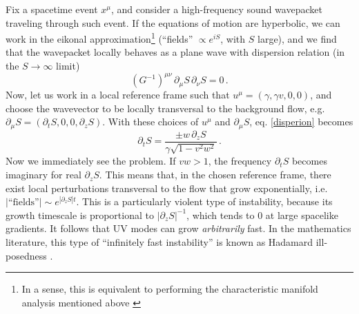 \documentclass[aps, prd, showkeys,superscriptaddress, nofootinbib,floatfix]{revtex4-2}
\begin{document}
Fix a spacetime event $x^\mu$, and consider a high-frequency sound wavepacket traveling through such event. If the equations of motion are hyperbolic, we can work in the eikonal approximation\footnote{In a sense, this is equivalent to performing the characteristic manifold analysis mentioned above \cite[\S 1.6]{Rauch_book}} (``fields'' $\propto e^{iS}$, with $S$ large), and we find that the wavepacket locally behaves as a plane wave with dispersion relation \cite{Babichev:2007dw} (in the $S\rightarrow \infty$ limit)
\begin{equation}\label{disperion}
(G^{-1})^{\mu \nu} \, \partial_\mu S \, \partial_\nu S =0 \, .
\end{equation}
Now, let us work in a local reference frame such that $u^\mu=(\gamma,\gamma v,0,0)$, and choose the wavevector to be locally transversal to the background flow, e.g. $\partial_\mu S=(\partial_t S,0,0,\partial_z S)$. With these choices of $u^\mu$ and $\partial_\mu S$, eq. \eqref{disperion}  becomes
\begin{equation}\label{illposed}
\partial_t S =\dfrac{\pm w \, \partial_z S}{\gamma \sqrt{1-v^2 w^2}} \, .
\end{equation}
Now we immediately see the problem. If $vw>1$, the frequency $\partial_t S$ becomes imaginary for real $\partial_z S$. This means that, in the chosen reference frame, there exist local perturbations transversal to the flow that grow exponentially, i.e. $|\text{``fields''}|\sim e^{|\partial_z S|t}$. This is a particularly violent type of instability, because its growth timescale is proportional to $|\partial_z S|^{-1}$, which tends to 0 at large spacelike gradients. It follows that UV modes can grow \textit{arbitrarily} fast. In the mathematics literature, this type of ``infinitely fast instability'' is known as Hadamard ill-posedness \cite[\S 3.10]{Rauch_book}. 
\end{document}
